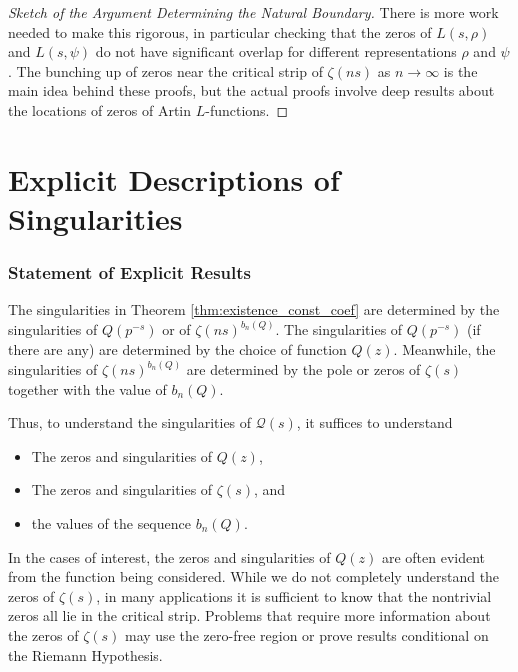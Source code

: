 \documentclass[12pt]{amsart}
\theoremstyle{plain}
\begin{document}
\begin{proof}[Sketch of the Argument Determining the Natural Boundary]
    There is more work needed to make this rigorous, in particular checking that the zeros of $L(s,\rho)$ and $L(s,\psi)$ do not have significant overlap for different representations $\rho$ and $\psi$. The bunching up of zeros near the critical strip of $\zeta(ns)$ as $n\to \infty$ is the main idea behind these proofs, but the actual proofs involve deep results about the locations of zeros of Artin $L$-functions.
\end{proof}




 













\part{Explicit Descriptions of Singularities}\label{part:explicit}

\section{Statement of Explicit Results}

The singularities in Theorem \ref{thm:existence_const_coef} are determined by the singularities of $Q(p^{-s})$ or of $\zeta(ns)^{b_n(Q)}$. The singularities of $Q(p^{-s})$ (if there are any) are determined by the choice of function $Q(z)$. Meanwhile, the singularities of $\zeta(ns)^{b_n(Q)}$ are determined by the pole or zeros of $\zeta(s)$ together with the value of $b_n(Q)$.

Thus, to understand the singularities of $\mathcal{Q}(s)$, it suffices to understand
\begin{itemize}
    \item The zeros and singularities of $Q(z)$,
    \item The zeros and singularities of $\zeta(s)$, and
    \item the values of the sequence $b_n(Q)$.
\end{itemize}
In the cases of interest, the zeros and singularities of $Q(z)$ are often evident from the function being considered. While we do not completely understand the zeros of $\zeta(s)$, in many applications it is sufficient to know that the nontrivial zeros all lie in the critical strip. Problems that require more information about the zeros of $\zeta(s)$ may use the zero-free region or prove results conditional on the Riemann Hypothesis.
\end{document}
